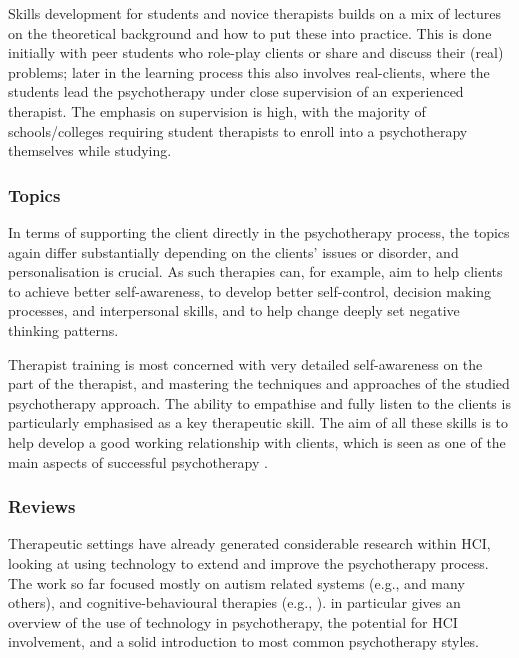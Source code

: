 \documentclass[prodmode,acmtochi]{acmsmall}
\newcommand{\todo}[1]{\textrm{\textrm{\textcolor{LightBlue}{[[#1]]} } } }
\newcommand{\GeraldineFIX}[1]{}
\begin{document}
\GeraldineFIX{G: add in a sentence or two to give an autism review ... P: This is about methods so the review should be probably rather below (or in topics). Moreover, I do not want to get into all kinds of methods to autism training (and I do not have a good review I would trust to be non-controversial at the moment)}


Skills development for students and novice therapists builds on a mix of lectures on the theoretical background and how to put these into practice. This is done initially with peer students who role-play clients or share and discuss their (real) problems; later in the learning process this also involves real-clients, where the students lead the psychotherapy under close supervision of an experienced therapist. The emphasis on supervision is high, with the majority of schools/colleges requiring student therapists to enroll into a psychotherapy themselves while studying. 


\subsubsection*{Topics} 
In terms of supporting the client directly in the psychotherapy process, the topics again differ substantially depending on the clients' issues or disorder, and personalisation is crucial. As such therapies can, for example, aim to help clients to achieve better self-awareness, to develop better  self-control, decision making processes, and interpersonal skills, and to help change deeply set negative thinking patterns.  %

Therapist training is most concerned with very detailed self-awareness on the part of the therapist, and mastering the techniques and approaches of the studied psychotherapy approach. The ability to empathise and fully listen to the clients is particularly emphasised as a key therapeutic skill. The aim of all these skills is to help develop a good working relationship with clients, which is seen as one of the main aspects of successful psychotherapy \cite{Asay1999}.

\subsubsection*{Reviews}
Therapeutic settings have already generated considerable research within
HCI,  looking at using technology to extend and improve the psychotherapy process.
The work so far focused mostly on autism related systems (e.g.,
\cite{Escobedo2012,Picard2009,Hayes2011,Porayska-Pomsta2011,Hong2012} and many others), and cognitive-behavioural therapies (e.g., \cite{Coyle2011,Matthews2011}).  in particular gives an overview of the use of technology in psychotherapy, the potential for HCI involvement, and a solid introduction to most common psychotherapy styles.          
\end{document}
